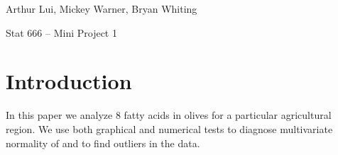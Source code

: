 \noindent Arthur Lui, Mickey Warner, Bryan Whiting

\noindent Stat 666 -- Mini Project 1

\section{Introduction}

In this paper we analyze 8 fatty acids in olives for a particular agricultural region. We use both graphical and numerical tests to diagnose multivariate normality of and to find outliers in the data.
